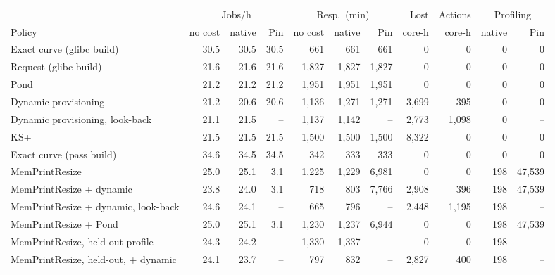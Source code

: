 \begin{tabular}{lrrrrrrrrrr}
\toprule
 & \multicolumn{3}{c}{Jobs/h} & \multicolumn{3}{c}{Resp.\ (min)} & Lost & Actions & \multicolumn{2}{c}{Profiling} \\
\cmidrule(lr){2-4} \cmidrule(lr){5-7} \cmidrule(lr){10-11}
Policy & no cost & native & Pin & no cost & native & Pin & core-h & core-h & native & Pin \\
\midrule
Exact curve (glibc build) & 30.5 & 30.5 & 30.5 & 661 & 661 & 661 & 0 & 0 & 0 & 0 \\
Request (glibc build) & 21.6 & 21.6 & 21.6 & 1{,}827 & 1{,}827 & 1{,}827 & 0 & 0 & 0 & 0 \\
Pond & 21.2 & 21.2 & 21.2 & 1{,}951 & 1{,}951 & 1{,}951 & 0 & 0 & 0 & 0 \\
Dynamic provisioning & 21.2 & 20.6 & 20.6 & 1{,}136 & 1{,}271 & 1{,}271 & 3{,}699 & 395 & 0 & 0 \\
Dynamic provisioning, look-back & 21.1 & 21.5 & -- & 1{,}137 & 1{,}142 & -- & 2{,}773 & 1{,}098 & 0 & -- \\
KS+ & 21.5 & 21.5 & 21.5 & 1{,}500 & 1{,}500 & 1{,}500 & 8{,}322 & 0 & 0 & 0 \\
Exact curve (pass build) & 34.6 & 34.5 & 34.5 & 342 & 333 & 333 & 0 & 0 & 0 & 0 \\
MemPrintResize & 25.0 & 25.1 & 3.1 & 1{,}225 & 1{,}229 & 6{,}981 & 0 & 0 & 198 & 47{,}539 \\
MemPrintResize + dynamic & 23.8 & 24.0 & 3.1 & 718 & 803 & 7{,}766 & 2{,}908 & 396 & 198 & 47{,}539 \\
MemPrintResize + dynamic, look-back & 24.6 & 24.1 & -- & 665 & 796 & -- & 2{,}448 & 1{,}195 & 198 & -- \\
MemPrintResize + Pond & 25.0 & 25.1 & 3.1 & 1{,}230 & 1{,}237 & 6{,}944 & 0 & 0 & 198 & 47{,}539 \\
MemPrintResize, held-out profile & 24.3 & 24.2 & -- & 1{,}330 & 1{,}337 & -- & 0 & 0 & 198 & -- \\
MemPrintResize, held-out, + dynamic & 24.1 & 23.7 & -- & 797 & 832 & -- & 2{,}827 & 400 & 198 & -- \\
\bottomrule
\end{tabular}
